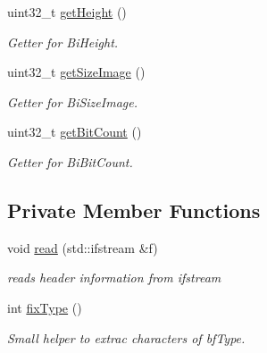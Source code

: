 \begin{DoxyCompactItemize}
uint32\+\_\+t \mbox{\hyperlink{classBitmapHeader_a106f72d6c256327342029edf8e18bde1}{get\+Height}} ()
\begin{DoxyCompactList}\small\item\em Getter for Bi\+Height. \end{DoxyCompactList}\item 
uint32\+\_\+t \mbox{\hyperlink{classBitmapHeader_aa55f157d6852ce35add8c5db54ccadae}{get\+Size\+Image}} ()
\begin{DoxyCompactList}\small\item\em Getter for Bi\+Size\+Image. \end{DoxyCompactList}\item 
uint32\+\_\+t \mbox{\hyperlink{classBitmapHeader_a2660782990f1d9547e0aef501f666969}{get\+Bit\+Count}} ()
\begin{DoxyCompactList}\small\item\em Getter for Bi\+Bit\+Count. \end{DoxyCompactList}\end{DoxyCompactItemize}
\subsection*{Private Member Functions}
\begin{DoxyCompactItemize}
\item 
void \mbox{\hyperlink{classBitmapHeader_a6f91559c339074535445780e99e5f717}{read}} (std\+::ifstream \&f)
\begin{DoxyCompactList}\small\item\em reads header information from ifstream \end{DoxyCompactList}\item 
int \mbox{\hyperlink{classBitmapHeader_aa02e59db95074c6a96a44dac03cee77b}{fix\+Type}} ()
\begin{DoxyCompactList}\small\item\em Small helper to extrac characters of bf\+Type. \end{DoxyCompactList}\end{DoxyCompactItemize}
